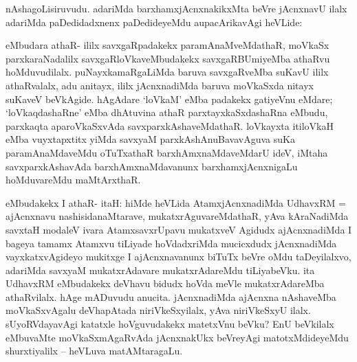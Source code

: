 \begin{artha}
nAshagoLisiruvudu. adariMda barxhamxjAcnxnakikxMta beVre jAcnxnavU ilalx adariMda paDedidadxnenx paDedideyeMdu aupacArikavAgi heVLide:
\end{artha}


\begin{artha}
eMbudara athaR- ililx savxgaRpadakekx paramAnaMveMdathaR, moVkaSx parxkaraNadalilx savxgaRloVkaveMbudakekx savxgaRBUmiyeMba athaRvu hoMduvudilalx. puNayxkamaRgaLiMda baruva savxgaRveMba suKavU ililx athaRvalalx, adu anitayx, ililx jAcnxna\-diMda baruva moVkaSxda nitayx suKaveV beVkAgide. hAgAdare `loVkaM' eMba padakekx gatiyeVnu eMdare; `loVkaqdashaRne' eMba dhAtuvina athaR parxtayxkaSxdashaRna eMbudu, parxkaqta aparoVkaSxvAda savxparxkAshaveMdathaR. loVkayxta itiloVkaH eMba vuyxtapxtitx yiMda savxyaM parxkAshAnuBavavAguva suKa paramAnaMdaveMdu oTuTxathaR barxhAmxnaMdaveMdarU ideV, iMtaha savxparxkAshavAda barxhAmxnaMdavanunx barxhamxjAcnxnigaLu hoMduvareMdu maMtArxthaR. 
\end{artha}


\begin{artha}
eMbudakekx I athaR- itaH: hiMde heVLida AtamxjAcnxnadiMda UdhavxRM = ajAcnxnavu nashisidanaMtarave, mukatxrAguvareMdathaR, yAva kAraNadiMda savxtaH modaleV ivara AtamxsavxrUpavu mukatxveV Agidudx ajAcnxnadiMda I bageya tamamx Atamxvu tiLiyade hoVdadxriMda mucicxdudx jAcnxnadiMda vayxkatxvAgideyo mukitxge I ajAcnxnavanunx biTuTx beVre oMdu taDeyilalxvo, adariMda savxyaM mukatxrAdavare mukatxrAdareMdu tiLiyabeVku. ita UdhavxRM eMbudakekx deVhavu bidudx hoVda meVle mukatxrAdareMba athaRvilalx. hAge mADuvudu anucita. jAcnxnadiMda ajAcnxna nAshaveMba moVkaSxvAgalu deVhapAtada niriVkeSxyilalx, yAva niriVkeSxyU ilalx. sUyoRVdayavAgi katatxle hoVguvudakekx matetxVnu beVku? EnU beVkilalx eMbuvaMte moVkaSxmAgaRvAda jAcnxnakUkx beVreyAgi matotxMdideyeMdu shurxtiyalilx -- heVLuva matAMtaragaLu.
\end{artha}


